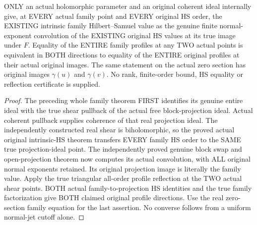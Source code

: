 \begin{theorem}
\label{hir:actual-original-translation-family-entire-intrinsic-hs}
\leanok
ONLY an actual holomorphic parameter and an original coherent ideal
internally give, at EVERY actual family point and EVERY original HS order,
the EXISTING intrinsic family Hilbert--Samuel value as the genuine finite
normal-exponent convolution of the EXISTING original HS values at its true
image under $F$. Equality of the ENTIRE family profiles at any TWO actual
points is equivalent in BOTH directions to equality of the ENTIRE original
profiles at their actual original images. The same statement on the actual
zero section has original images $\gamma(u)$ and $\gamma(v)$. No rank,
finite-order bound, HS equality or reflection certificate is supplied.
\end{theorem}
\begin{proof}
The preceding whole family theorem FIRST identifies its genuine entire
ideal with the true shear pullback of the actual free block-projection
ideal. Actual coherent pullback supplies coherence of that real projection
ideal. The independently constructed real shear is biholomorphic, so the
proved actual original intrinsic-HS theorem transfers EVERY family HS order
to the SAME true projection-ideal point. The independently proved genuine
block swap and open-projection theorem now computes its actual convolution,
with ALL original normal exponents retained. Its original projection image
is literally the family value. Apply the true triangular all-order profile
reflection at the TWO actual shear points. BOTH actual family-to-projection
HS identities and the true family factorization give BOTH claimed original
profile directions. Use the real zero-section family equation for the
last assertion. No converse follows from a uniform normal-jet cutoff alone.
\end{proof}

